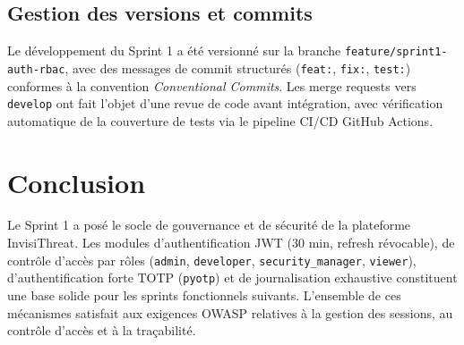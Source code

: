 \subsection{Gestion des versions et commits}
Le développement du Sprint 1 a été versionné sur la branche \texttt{feature/sprint1-auth-rbac}, avec des messages de commit structurés (\texttt{feat:}, \texttt{fix:}, \texttt{test:}) conformes à la convention \textit{Conventional Commits}. Les merge requests vers \texttt{develop} ont fait l'objet d'une revue de code avant intégration, avec vérification automatique de la couverture de tests via le pipeline CI/CD GitHub Actions.

\section{Conclusion}
Le Sprint 1 a posé le socle de gouvernance et de sécurité de la plateforme InvisiThreat. Les modules d'authentification JWT (30 min, refresh révocable), de contrôle d'accès par rôles (\texttt{admin}, \texttt{developer}, \texttt{security\_manager}, \texttt{viewer}), d'authentification forte TOTP (\texttt{pyotp}) et de journalisation exhaustive constituent une base solide pour les sprints fonctionnels suivants. L'ensemble de ces mécanismes satisfait aux exigences OWASP relatives à la gestion des sessions, au contrôle d'accès et à la traçabilité.
